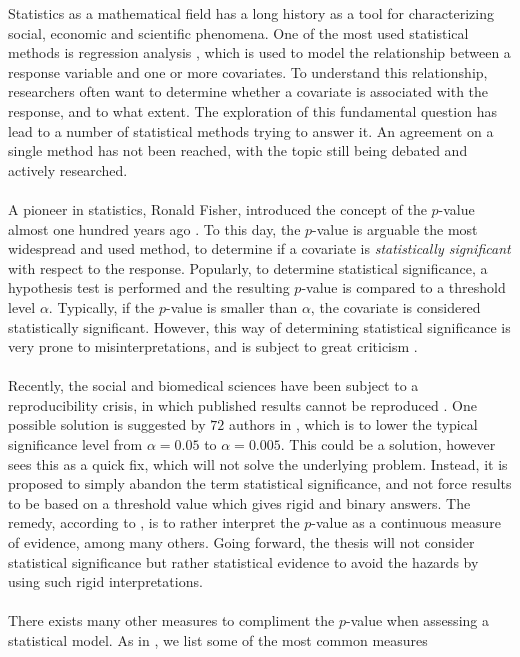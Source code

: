 Statistics as a mathematical field has a long history as a tool for characterizing social, economic and scientific phenomena. One of the most used statistical methods is regression analysis \citep{Gromping_2015}, which is used to model the relationship between a response variable and one or more covariates. To understand this relationship, researchers often want to determine whether a covariate is associated with the response, and to what extent. The exploration of this fundamental question has lead to a number of statistical methods trying to answer it. An agreement on a single method has not been reached, with the topic still being debated and actively researched. 
\\
\\
A pioneer in statistics, Ronald Fisher, introduced the concept of the $p$-value almost one hundred years ago \citep{Fisher1925}. To this day, the $p$-value is arguable the most widespread and used method, to determine if a covariate is \textit{statistically significant} with respect to the response. Popularly, to determine statistical significance, a hypothesis test is performed and the resulting $p$-value is compared to a threshold level $\alpha$. Typically, if the $p$-value is smaller than $\alpha$, the covariate is considered statistically significant. However, this way of determining statistical significance is very prone to misinterpretations, and is subject to great criticism \citep{benjamin2018redefine}. 
\\
\\
Recently, the social and biomedical sciences have been subject to a reproducibility crisis, in which published results cannot be reproduced \citep{gelman_crisis}. One possible solution is suggested by $72$ authors in \citet{benjamin2018redefine}, which is to lower the typical significance level from $\alpha=0.05$ to $\alpha=0.005$. This could be a solution, however \citet{gelman_crisis} sees this as a quick fix, which will not solve the underlying problem. Instead, it is proposed to simply abandon the term statistical significance, and not force results to be based on a threshold value which gives rigid and binary answers. The remedy, according to \citet{gelman_crisis}, is to rather interpret the $p$-value as a continuous measure of evidence, among many others. Going forward, the thesis will not consider statistical significance but rather statistical evidence to avoid the hazards by using such rigid interpretations.
\\
\\
There exists many other measures to compliment the $p$-value when assessing a statistical model. As in \citet{Arnstad:Relative_variable_importance_in_Bayesian_linear_mixed_models:2024}, we list some of the most common measures
